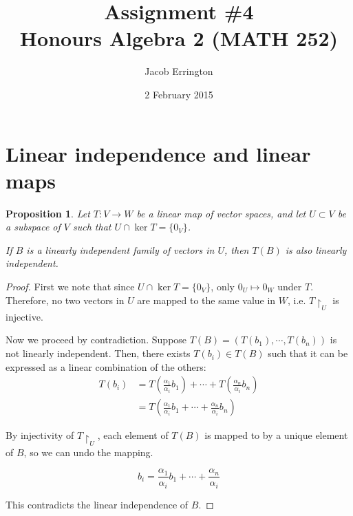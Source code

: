 \documentclass{article}
\author{Jacob Errington}
\title{Assignment \#4\\Honours Algebra 2 (MATH 252)}
\date{2 February 2015}
\newtheorem{proposition}{Proposition}
\begin{document}
\maketitle

\section{Linear independence and linear maps}

\begin{proposition}
    Let $T : V \to W$ be a linear map of vector spaces, and let $U \subset V$ be a subspace of $V$ such that $U \cap \ker T = \{0_V\}$.

    If $B$ is a linearly independent family of vectors in $U$, then $T(B)$ is also linearly independent.
\end{proposition}

\begin{proof}
    First we note that since $U \cap \ker T = \{0_V\}$, only $0_U \mapsto 0_W$ under $T$.
    Therefore, no two vectors in $U$ are mapped to the same value in $W$, i.e. $T\restriction_U$ is injective.

    Now we proceed by contradiction.
    Suppose $T(B) = (T(b_1), \cdots, T(b_n))$ is not linearly independent.
    Then, there exists $T(b_i) \in T(B)$ such that it can be expressed as a linear combination of the others:
    \begin{align*}
        T(b_i) &= T(\frac{\alpha_1}{\alpha_i} b_1) + \cdots + T(\frac{\alpha_n}{\alpha_i} b_n) \\
              &= T(\frac{\alpha_1}{\alpha_i} b_1 + \cdots + \frac{\alpha_n}{\alpha_i} b_n)
    \end{align*}

    By injectivity of $T\restriction_U$, each element of $T(B)$ is mapped to by a unique element of $B$, so we can undo the mapping.

    \begin{equation*}
        b_i = \frac{\alpha_1}{\alpha_i} b_1 + \cdots + \frac{\alpha_n}{\alpha_i}
    \end{equation*}

    This contradicts the linear independence of $B$.
\end{proof}
\end{document}
